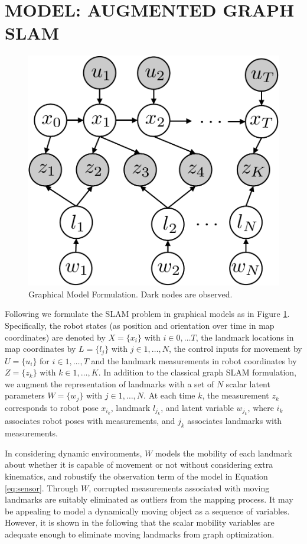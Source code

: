 \section{MODEL: AUGMENTED GRAPH SLAM}
\label{sec:model}
\begin{figure}[!t]
\begin{center}
 \includegraphics[width=0.5\columnwidth]{fig/model} 
\end{center}
\caption{Graphical Model Formulation. Dark nodes are observed.}
\label{fig:model}
\end{figure}

Following \cite{isam} we formulate the SLAM problem in graphical models as in Figure \ref{fig:model}. Specifically, the robot states (as position and orientation over time in map coordinates) are denoted by $X = \{x_i\}$ with $i \in 0, \dots T$, the landmark locations in map coordinates by $L = \{l_j\}$ with $j \in 1,\dots, N$, the control inputs for movement by $U = \{u_i\}$ for $i \in 1,\dots, T$ and the landmark measurements in robot coordinates by $Z = \{z_k\}$ with $k \in 1, \dots, K$. In addition to the classical graph SLAM formulation, we augment the representation of landmarks with a set of $N$ scalar latent parameters $W = \{w_j\}$ with $j \in 1, \dots, N$. At each time $k$, the measurement $z_k$ corresponds to robot pose $x_{i_k}$, landmark $l_{j_k}$, and latent variable $w_{j_k}$, where $i_k$ associates robot poses with measurements, and $j_k$ associates landmarks with measurements.


In considering dynamic environments, $W$ models the mobility of each landmark about whether it is capable of movement or not without considering extra kinematics, and robustify the observation term of the model in Equation \ref{eq:sensor}.  Through $W$, corrupted measurements associated with moving landmarks are suitably eliminated as outliers from the mapping process. It may be appealing to model a dynamically moving object as a sequence of variables. However, it is shown in the following that the scalar mobility variables are adequate enough to eliminate moving landmarks from graph optimization.

